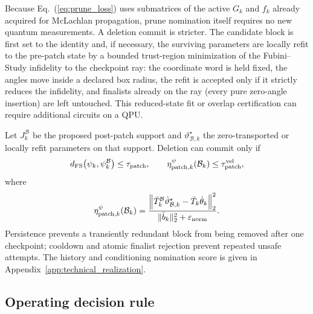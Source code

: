 \documentclass[
  reprint,
  amsmath,
  amssymb,
  aps,
  pra,
  nofootinbib,
  superscriptaddress,
  floatfix
]{revtex4-2}
\newcommand{\eps}{\varepsilon}
\begin{document}
Because Eq.~(\ref{eq:prune_loss}) uses submatrices of the active \(G_k\) and \(f_k\) already acquired for McLachlan propagation, prune nomination itself requires no new quantum measurements.  A deletion commit is stricter.  The candidate block is first set to the identity and, if necessary, the surviving parameters are locally refit to the pre-patch state by a bounded trust-region minimization of the Fubini--Study infidelity to the checkpoint ray: the coordinate word is held fixed, the angles move inside a declared box radius, the refit is accepted only if it strictly reduces the infidelity, and finalists already on the ray (every pure zero-angle insertion) are left untouched.  This reduced-state fit or overlap certification can require additional circuits on a QPU.

Let \(J_k^{\mathcal B}\) be the proposed post-patch support and \(\vartheta_{\mathcal B,k}^{\star}\) the zero-transported or locally refit parameters on that support.  Deletion can commit only if
\begin{equation}
d_{\rm FS}\!\left(
\psi_k,
\psi_k^{\mathcal B}
\right)
\le\tau_{\rm patch},
\qquad
\eta_{{\rm patch},k}^{\psi}(\mathcal B_k)
\le\tau_{\rm patch}^{\rm vel},
\label{eq:patch_continuity}
\end{equation}
where
\begin{equation}
\eta_{{\rm patch},k}^{\psi}(\mathcal B_k)
=
\frac{
\left\|
\bar T_k^{\mathcal B}\dot\vartheta_{\mathcal B,k}^{\star}
-\bar T_k\dot\theta_k
\right\|_2^2
}{
\|\bar b_k\|_2^2+\eps_{\rm norm}
}.
\label{eq:patch_velocity_continuity}
\end{equation}
Persistence prevents a transiently redundant block from being removed after one checkpoint; cooldown and atomic finalist rejection prevent repeated unsafe attempts.  The history and conditioning nomination score is given in Appendix~\ref{app:technical_realization}.

\subsection{Operating decision rule}
\end{document}
